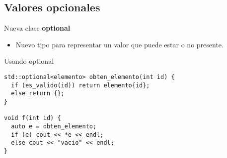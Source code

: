 \subsection{Valores opcionales}

\begin{frame}[t,fragile]{Nueva clase \textbf{optional}}
\begin{itemize}
  \item Nuevo tipo  para representar un valor que puede estar o no presente.
\end{itemize}
\begin{block}{Usando optional}
\begin{lstlisting}
std::optional<elemento> obten_elemento(int id) {
  if (es_valido(id)) return elemento{id};
  else return {};
}

void f(int id) {
  auto e = obten_elemento;
  if (e) cout << *e << endl;
  else cout << "vacio" << endl;
}
\end{lstlisting}
\end{block}
\end{frame}

